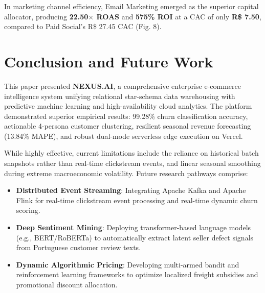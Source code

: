 \documentclass[conference]{IEEEtran}
\begin{document}
In marketing channel efficiency, Email Marketing emerged as the superior capital allocator, producing \textbf{22.50$\times$ ROAS} and \textbf{575\% ROI} at a CAC of only \textbf{R\$ 7.50}, compared to Paid Social's R\$ 27.45 CAC (Fig. 8).

\section{Conclusion and Future Work}
This paper presented \textbf{NEXUS.AI}, a comprehensive enterprise e-commerce intelligence system unifying relational star-schema data warehousing with predictive machine learning and high-availability cloud analytics. The platform demonstrated superior empirical results: 99.28\% churn classification accuracy, actionable 4-persona customer clustering, resilient seasonal revenue forecasting (13.84\% MAPE), and robust dual-mode serverless edge execution on Vercel.

While highly effective, current limitations include the reliance on historical batch snapshots rather than real-time clickstream events, and linear seasonal smoothing during extreme macroeconomic volatility. Future research pathways comprise:
\begin{itemize}
    \item \textbf{Distributed Event Streaming}: Integrating Apache Kafka and Apache Flink for real-time clickstream event processing and real-time dynamic churn scoring.
    \item \textbf{Deep Sentiment Mining}: Deploying transformer-based language models (e.g., BERT/RoBERTa) to automatically extract latent seller defect signals from Portuguese customer review texts.
    \item \textbf{Dynamic Algorithmic Pricing}: Developing multi-armed bandit and reinforcement learning frameworks to optimize localized freight subsidies and promotional discount allocation.
\end{itemize}
\end{document}
